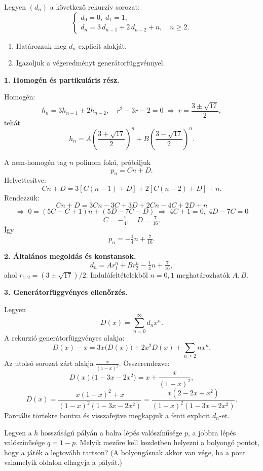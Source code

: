 \begin{extraproblem}
Legyen $(d_{n})$ a következő rekurzív sorozat: 
\[
\begin{cases}
d_{0}=0,\;d_{1}=1,\\
d_{n}=3\,d_{n-1}+2\,d_{n-2}+n,\quad n\ge2.
\end{cases}
\]
\begin{enumerate}
\item Határozzuk meg $d_{n}$ explicit alakját. 
\item Igazoljuk a végeredményt generátorfüggvénnyel. 
\end{enumerate}
\end{extraproblem}

\vspace{1em}

\begin{solution}
\textbf{1. Homogén és partikuláris rész.}

Homogén: 
\[
h_{n}=3h_{n-1}+2h_{n-2},\quad r^{2}-3r-2=0\;\Rightarrow\;r=\frac{3\pm\sqrt{17}}{2},
\]
tehát 
\[
h_{n}=A\!\left(\frac{3+\sqrt{17}}{2}\right)^{n}+B\!\left(\frac{3-\sqrt{17}}{2}\right)^{n}.
\]

A nem‐homogén tag $n$ polinom fokú, próbáljuk 
\[
p_{n}=Cn+D.
\]
Helyettesítve: 
\[
Cn+D=3[C(n-1)+D]+2[C(n-2)+D]+n.
\]
Rendezzük: 
\[
Cn+D=3Cn-3C+3D+2Cn-4C+2D+n
\]
\[
\Longrightarrow\;0=(5C-C+1)n+(5D-7C-D)\;\Longrightarrow\;4C+1=0,\;4D-7C=0
\]
\[
C=-\tfrac{1}{4},\quad D=\tfrac{7}{16}.
\]
Így 
\[
p_{n}=-\tfrac{1}{4}n+\tfrac{7}{16}.
\]

\textbf{2. Általános megoldás és konstansok.} 
\[
d_{n}=Ar_{1}^{n}+Br_{2}^{n}-\tfrac{1}{4}n+\tfrac{7}{16},
\]
ahol $r_{1,2}=(3\pm\sqrt{17})/2$. Indulófeltételekből $n=0,1$ meghatározhatók
$A,B$.

\textbf{3. Generátorfüggvényes ellenőrzés.}

Legyen 
\[
D(x)=\sum_{n=0}^{\infty}d_{n}x^{n}.
\]
A rekurzió generátorfüggvényes alakja: 
\[
D(x)-x=3x\bigl(D(x)\bigr)+2x^{2}D(x)+\sum_{n\ge2}nx^{n}.
\]
Az utolsó sorozat zárt alakja $\frac{x}{(1-x)^{2}}$. Összerendezve:
\[
D(x)\bigl(1-3x-2x^{2}\bigr)=x+\frac{x}{(1-x)^{2}},
\]
\[
D(x)=\frac{x(1-x)^{2}+x}{(1-x)^{2}(1-3x-2x^{2})}=\frac{x(2-2x+x^{2})}{(1-x)^{2}(1-3x-2x^{2})}.
\]
Parciális törtekre bontva és visszafejtve megkapjuk a fenti explicit
$d_{n}$-et. 
\end{solution}
\begin{extraproblem}
Legyen a $h$ hosszúságú pályán a balra lépés valószínűsége $p$,
a jobbra lépés valószínűsége $q=1-p$. Melyik mezőre kell kezdetben
helyezni a bolyongó pontot, hogy a játék a legtovább tartson? (A bolyongásnak
akkor van vége, ha a pont valamelyik oldalon elhagyja a pályát.) 
\end{extraproblem}


